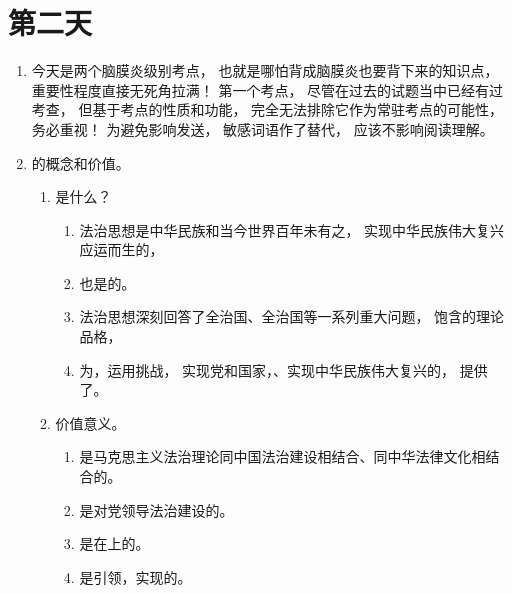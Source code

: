 \section{第二天}
\begin{enumerate}
  \item 今天是两个脑膜炎级别考点，
        也就是哪怕背成脑膜炎也要背下来的知识点，
        重要性程度直接无死角拉满！
        第一个考点，
        尽管在过去的试题当中已经有过考查，
        但基于考点的性质和功能，
        完全无法排除它作为常驻考点的可能性，
        务必重视！
        为避免影响发送，
        敏感词语作了替代，
        应该不影响阅读理解。
  \item {}的概念和价值。
        \begin{enumerate}
          \item 是什么？
                \begin{enumerate}
                  \item 法治思想是中华民族和当今世界百年未有之，
                        实现中华民族伟大复兴应运而生的，
                  \item 也是的。
                  \item 法治思想深刻回答了全治国、全治国等一系列重大问题，
                        饱含的理论品格，
                  \item 为，运用挑战，
                        实现党和国家，、实现中华民族伟大复兴的，
                        提供了。
                \end{enumerate}
          \item 价值意义。
                \begin{enumerate}
                  \item \blh 是马克思主义法治理论同中国法治建设相结合、同中华法律文化相结合的。
                  \item \blh 是对党领导法治建设的。
                  \item \blh 是在上的。
                  \item \blh 是引领，实现的。
                \end{enumerate}

\end{enumerate}
\end{enumerate}
